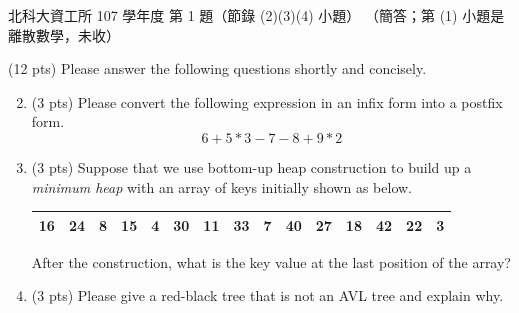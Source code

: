 \begin{pastexam}[label={px:ntut-107-ci-01}]{北科大資工所 107 學年度 第 1 題（節錄 (2)(3)(4) 小題）}
（簡答；第 (1) 小題是離散數學，未收）

(12 pts) Please answer the following questions shortly and concisely.
\begin{enumerate}[label=(\arabic*)]
\setcounter{enumi}{1}
\item (3 pts) Please convert the following expression in an infix form into a postfix form.
\[ 6+5*3-7-8+9*2 \]
\item (3 pts) Suppose that we use bottom-up heap construction to build up a \textit{minimum heap}
with an array of keys initially shown as below.
\begin{center}
\begin{tabular}{|*{15}{c|}}
\hline
16 & 24 & 8 & 15 & 4 & 30 & 11 & 33 & 7 & 40 & 27 & 18 & 42 & 22 & 3 \\ \hline
\end{tabular}
\end{center}
After the construction, what is the key value at the last position of the array?
\item (3 pts) Please give a red-black tree that is not an AVL tree and explain why.
\end{enumerate}
\end{pastexam}

